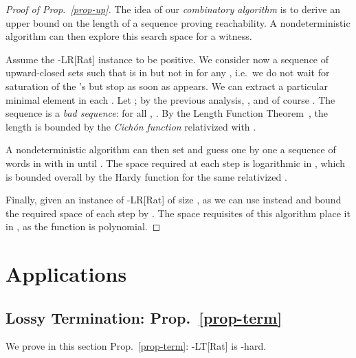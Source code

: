 \begin{proof}[Proof of Prop.~\ref{prop-up}] The idea of our
  \emph{combinatory algorithm} is to derive an upper bound on the
  length of a sequence proving reachability.  A nondeterministic
  algorithm can then explore this search space for a witness.

  Assume the -LR[Rat] instance to be positive.  We consider now
  a sequence of upward-closed sets  such that  is in 
  but not in  for any , i.e.\ we do not wait for
  saturation of the 's but stop as soon as  appears.  We can
  extract a particular minimal element  in each
  .  Let ; by the previous
  analysis, , and of course .  The
  sequence  is a \emph{bad sequence}: for all
  , .  By the Length Function
  Theorem~\citep{SS-icalp2011}, the length  is bounded by the
  \emph{Cich\'on function} 
  relativized with .

  A nondeterministic algorithm can then set  and guess one by
  one a sequence of  words  in  with  in
   until .  The space
  required at each step is logarithmic in , which is bounded
  overall by the Hardy function 
  for the same relativized .

  Finally, given an instance  of -LR[Rat] of size
  , as  we can use  instead and bound the
  required space of each step by . The
  space requisites of this algorithm place it in
  , as the function  is polynomial.
\end{proof}

\section{Applications}

\subsection{Lossy Termination: Prop.~\ref{prop-term}}\label{ax-term}

We prove in this section Prop.~\ref{prop-term}: -LT[Rat] is 
-hard.


